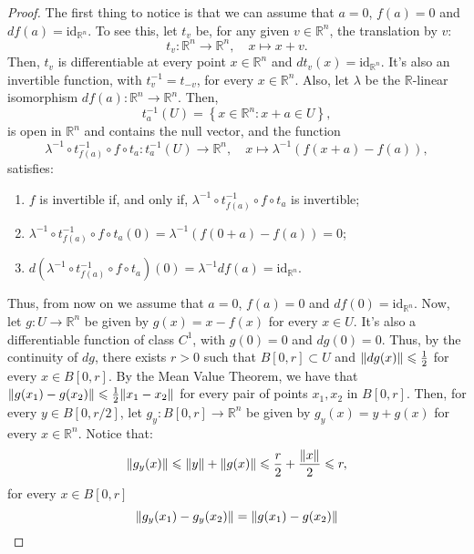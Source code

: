 \begin{proof}
  The first thing to notice is that we can assume that \({a=0}\), \(f(a)=0\) and \(df(a)=\text{id}_{\mathbb{R}^{n}}\). To see this, let \(t_{v}\) be, for any given \({v}\in{\mathbb{R}^{n}}\), the translation by \(v\):
  \[
    t_{v}:\mathbb{R}^{n}\to\mathbb{R}^{n},\quad{{x}\mapsto{x+v}}.
  \]
  Then, \(t_{v}\) is differentiable at every point \({x}\in{\mathbb{R}^{n}}\) and \(dt_{v}(x)=\text{id}_{\mathbb{R}^{n}}\). It's also an invertible function, with \(t_{v}^{-1}=t_{-v}\), for every \({x}\in{\mathbb{R}^{n}}\). Also, let \(\lambda\) be the \(\mathbb{R}\)-linear isomorphism \(df(a):\mathbb{R}^{n}\to\mathbb{R}^{n}\). Then,
  \[
    t_{a}^{-1}(U)=\left\{{x}\in{\mathbb{R}^{n}}:{x+a}\in{U}\right\},
  \]
  is open in \(\mathbb{R}^{n}\) and contains the null vector, and the function
  \[
    \lambda^{-1}\circ{t_{f(a)}^{-1}}\circ{f}\circ{t_{a}}:t_{a}^{-1}(U)\to\mathbb{R}^{n},\quad{{x}\mapsto{\lambda^{-1}(f(x+a)-f(a))}},
  \]
  satisfies:
  \begin{enumerate}
    \item
      \(f\) is invertible if, and only if, \(\lambda^{-1}\circ{t_{f(a)}^{-1}}\circ{f}\circ{t_{a}}\) is invertible;
    \item
      \(\lambda^{-1}\circ{t_{f(a)}^{-1}}\circ{f}\circ{t_{a}}(0)=\lambda^{-1}\left(f(0+a)-f(a)\right)=0\);
    \item
      \(d\left(\lambda^{-1}\circ{t_{f(a)}^{-1}}\circ{f}\circ{t_{a}}\right)(0)=\lambda^{-1}df(a)=\text{id}_{\mathbb{R}^{n}}\).
  \end{enumerate}
  Thus, from now on we assume that \(a=0\), \(f(a)=0\) and \(df(0)=\text{id}_{\mathbb{R}^{n}}\). Now, let \(g:{U}\to{\mathbb{R}^{n}}\) be given by \(g(x)=x-f(x)\) for every \({x}\in{U}\). It's also a differentiable function of class \(C^{1}\), with \(g(0)=0\) and \(dg(0)=0\). Thus, by the continuity of \(dg\), there exists \(r>0\) such that \({B[0,r]}\subset{U}\) and \(\lVert dg(x)\rVert\leqslant{\frac{1}{2}}\) for every \({x}\in{B[0,r]}\). By the Mean Value Theorem, we have that \(\lVert g(x_{1})-g(x_{2})\rVert\leqslant{\frac{1}{2}\lVert x_{1}-x_{2}\rVert}\) for every pair of points \(x_{1},x_{2}\) in \(B[0,r]\). Then, for every \({y}\in{B[0,r/2]}\), let \(g_{y}:B[0,r]\to\mathbb{R}^{n}\) be given by \(g_{y}(x)=y+g(x)\) for every \({x}\in{\mathbb{R}^{n}}\). Notice that:
  \[
    \lVert g_{y}(x)\rVert
    \leqslant
    \lVert y\rVert+\lVert g(x)\rVert
    \leqslant
    \frac{r}{2}+\frac{\lVert x\rVert}{2}
    \leqslant
    r,
  \]
  for every \({x}\in{B[0,r]}\)
  \[
    \lVert g_{y}(x_{1})-g_{y}(x_{2})\rVert
    =
    \lVert g(x_{1})-g(x_{2})\rVert
\]
\end{proof}
